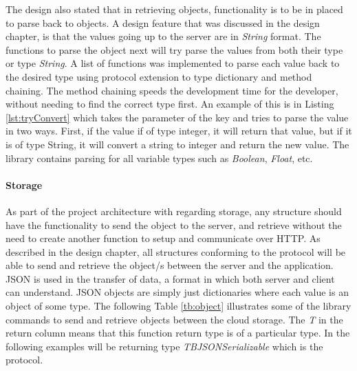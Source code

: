 The design also stated that in retrieving objects, functionality is to be in placed to parse back to objects. A design feature that was discussed in the design chapter, is that the values going up to the server are in \textit{String} format. The functions to parse the object next will try parse the values from both their type or type \textit{String}. A list of functions was implemented to parse each value back to the desired type using protocol extension to type dictionary and method chaining. The method chaining speeds the development time for the developer, without needing to find the correct type first. An example of this is in Listing \ref{lst:tryConvert} which takes the parameter of the key and tries to parse the value in two ways. First, if the value if of type integer, it will return that value, but if it is of type String, it will convert a string to integer and return the new value. The library contains parsing for all variable types such as \textit{Boolean}, \textit{Float}, etc.



\paragraph{Storage}

As part of the project architecture with regarding storage, any structure should have the functionality to send the object to the server, and retrieve without the need to create another function to setup and communicate over HTTP. As described in the design chapter, all structures conforming to the protocol will be able to send and retrieve the object/s between the server and the application. JSON is used in the transfer of data, a format in which both server and client can understand. JSON objects are simply just dictionaries where each value is an object of some type. The following Table \ref{tb:object} illustrates some of the library commands to send and retrieve objects between the cloud storage. The \textit{T} in the return column means that this function return type is of a particular type. In the following examples will be returning type \textit{TBJSONSerializable} which is the protocol.

